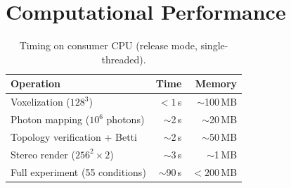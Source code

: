 \documentclass[11pt,a4paper]{article}
\theoremstyle{remark}
\begin{document}
\section{Computational Performance}
\label{app:perf}

\begin{table}[H]
\centering
\caption{Timing on consumer CPU (release mode, single-threaded).}
\label{tab:perf}
\begin{tabular}{lrr}
\toprule
\textbf{Operation} & \textbf{Time} & \textbf{Memory} \\
\midrule
Voxelization ($128^3$) & $< 1$\,s & $\sim$100\,MB \\
Photon mapping ($10^6$ photons) & $\sim$2\,s & $\sim$20\,MB \\
Topology verification + Betti & $\sim$2\,s & $\sim$50\,MB \\
Stereo render ($256^2 \times 2$) & $\sim$3\,s & $\sim$1\,MB \\
Full experiment (55 conditions) & $\sim$90\,s & $< 200$\,MB \\
\bottomrule
\end{tabular}
\end{table}
\end{document}
